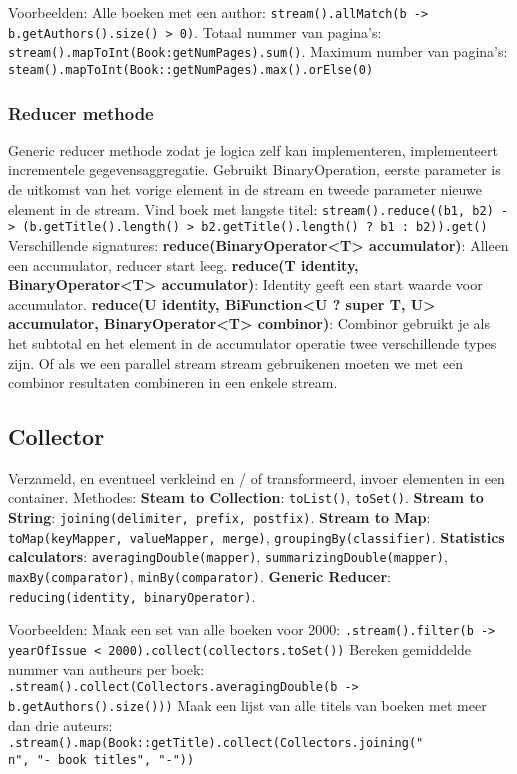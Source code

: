 Voorbeelden: 
Alle boeken met een author: \texttt{stream().allMatch(b -> b.getAuthors().size() > 0)}.
Totaal nummer van pagina's: \texttt{stream().mapToInt(Book:getNumPages).sum()}.
Maximum number van pagina's: \texttt{steam().mapToInt(Book::getNumPages).max().orElse(0)}

\subsubsection{Reducer methode}
Generic reducer methode zodat je logica zelf kan implementeren, implementeert incrementele gegevensaggregatie.
Gebruikt BinaryOperation, eerste parameter is de uitkomst van het vorige element in de stream en tweede parameter nieuwe element in de stream.
Vind boek met langste titel: \texttt{stream().reduce((b1, b2) -> (b.getTitle().length() > b2.getTitle().length() ? b1 : b2)).get()}
Verschillende signatures:
\textbf{reduce(BinaryOperator<T> accumulator)}: Alleen een accumulator, reducer start leeg.
\textbf{reduce(T identity, BinaryOperator<T> accumulator)}: Identity geeft een start waarde voor accumulator.
\textbf{reduce(U identity, BiFunction<U ? super T, U> accumulator, BinaryOperator<T> combinor)}:
Combinor gebruikt je als het subtotal en het element in de accumulator operatie twee verschillende types zijn.
Of als we een parallel stream stream gebruikenen moeten we met een combinor resultaten combineren in een enkele stream.

\subsection{Collector}
Verzameld, en eventueel verkleind en / of transformeerd, invoer elementen in een container.
Methodes:
\textbf{Steam to Collection}: \texttt{toList()}, \texttt{toSet()}.
\textbf{Stream to String}: \texttt{joining(delimiter, prefix, postfix)}.
\textbf{Stream to Map}: \texttt{toMap(keyMapper, valueMapper, merge)}, \texttt{groupingBy(classifier)}.
\textbf{Statistics calculators}: \texttt{averagingDouble(mapper)}, \texttt{summarizingDouble(mapper)}, \texttt{maxBy(comparator)}, \texttt{minBy(comparator)}.
\textbf{Generic Reducer}: \texttt{reducing(identity, binaryOperator)}.

Voorbeelden:
Maak een set van alle boeken voor 2000:
\texttt{.stream().filter(b -> yearOfIssue < 2000).collect(collectors.toSet())}
Bereken gemiddelde nummer van autheurs per boek:
\texttt{.stream().collect(Collectors.averagingDouble(b -> b.getAuthors().size()))}
Maak een lijst van alle titels van boeken met meer dan drie auteurs:
\texttt{.stream().map(Book::getTitle).collect(Collectors.joining("\\n", "- book titles", "-"))}

